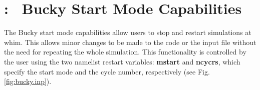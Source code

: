 
\chapter[\textbf{Bucky Start Mode Capabilities}]{: \ Bucky Start Mode Capabilities}
\label{app:restart}
The Bucky start mode capabilities allow users to stop and restart simulations at whim. This allows minor changes to be made to the code or the input file without the need for repeating the whole simulation. This functionality is controlled by the user using the two namelist restart variables: \textbf{mstart} and \textbf{ncycrs}, which specify the start mode and the cycle number, respectively (see Fig.\,\ref{fig:bucky.inp}).


\begin{SCfigure}[][h!]	

	\centering

\caption[A Bucky Input File]{ \\ Example 'bucky.inp' File \\  }
	\label{fig:bucky.inp}
\end{SCfigure}

